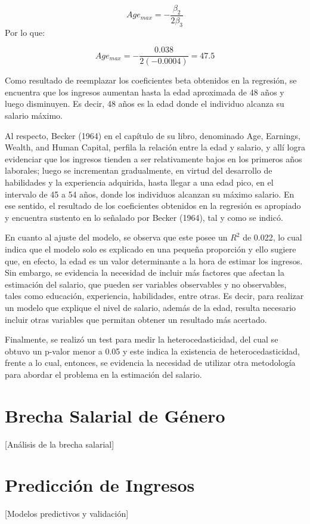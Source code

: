 \documentclass[12pt,a4paper,onecolumn]{article}
\begin{document}
$$Age_{max}= -\frac{\beta_2}{2\beta_3}$$
Por lo que:

$$Age_{max}= - \frac{0.038}{2(-0.0004)} = 47.5$$

Como resultado de reemplazar los coeficientes beta obtenidos en la regresión, se encuentra que los ingresos aumentan hasta la edad aproximada de 48 años y luego disminuyen. Es decir, 48 años es la edad donde el individuo alcanza su salario máximo.

Al respecto, Becker (1964) en el capítulo de su libro, denominado Age, Earnings, Wealth, and Human Capital, perfila la relación entre la edad y salario, y allí logra evidenciar que los ingresos tienden a ser relativamente bajos en los primeros años laborales; luego se incrementan gradualmente, en virtud del desarrollo de habilidades y la experiencia adquirida, hasta llegar a una edad pico, en el intervalo de 45 a 54 años, donde los individuos alcanzan su máximo salario. En ese sentido, el resultado de los coeficientes obtenidos en la regresión es apropiado y encuentra sustento en lo señalado por Becker (1964), tal y como se indicó.

En cuanto al ajuste del modelo, se observa que este posee un $R^2$ de 0.022, lo cual indica que el modelo solo es explicado en una pequeña proporción y ello sugiere que, en efecto, la edad es un valor determinante a la hora de estimar los ingresos. Sin embargo, se evidencia la necesidad de incluir más factores que afectan la estimación del salario, que pueden ser variables observables y no observables, tales como educación, experiencia, habilidades, entre otras. Es decir, para realizar un modelo que explique el nivel de salario, además de la edad, resulta necesario incluir otras variables que permitan obtener un resultado más acertado.

Finalmente, se realizó un test para medir la heterocedasticidad, del cual se obtuvo un p-valor menor a 0.05 y este indica la existencia de heterocedasticidad, frente a lo cual, entonces, se evidencia la necesidad de utilizar otra metodología para abordar el problema en la estimación del salario.

\section{Brecha Salarial de Género}
[Análisis de la brecha salarial]

\section{Predicción de Ingresos}
[Modelos predictivos y validación]
\end{document}
